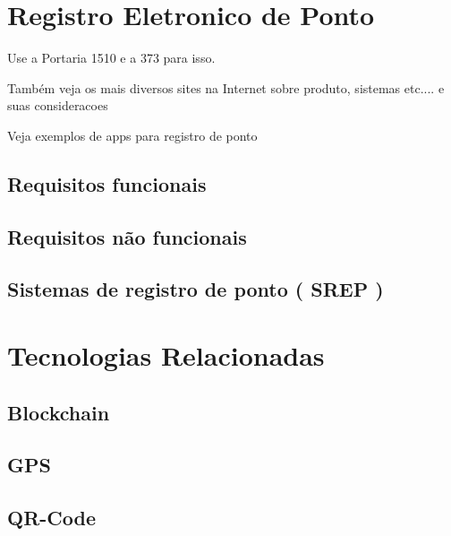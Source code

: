 \documentclass[12pt,openright,twoside,a4paper,english, brazil]{abntex2} %
\begin{document}
\chapter{Registro Eletronico de Ponto}

Use a Portaria 1510 e a 373 para isso. 

Também veja os mais diversos sites na Internet sobre produto, sistemas etc.... e suas consideracoes

Veja exemplos de apps para registro de ponto

\section{Requisitos funcionais}

\section{Requisitos não funcionais}

\section{Sistemas de registro de ponto ( SREP )}









\chapter{Tecnologias Relacionadas}

\section{Blockchain}

\section{GPS}

\section{QR-Code}
\end{document}
